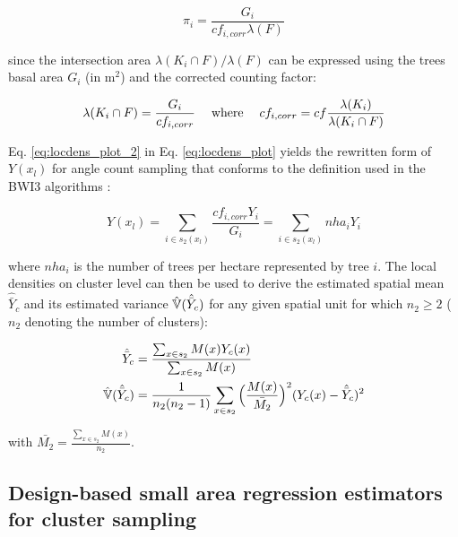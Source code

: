 \begin{equation}\label{eq:locdens_plot_2}
\pi_{i} = \frac{G_i}{cf_{i,corr}\lambda(F)}
\end{equation}

\noindent since the intersection area $\lambda(K_i \cap F)/\lambda(F)$ can be expressed using the trees basal area $G_i$ (in m$^2$) and the corrected counting factor:

\begin{equation}\label{eq:locdens_plot_3}
\lambda(K_i \cap F) = \frac{G_i}{cf_{i, corr}} \hspace{3ex} \text{where} \hspace{3ex} cf_{i,corr} = cf\frac{\lambda(K_i)}{\lambda(K_i \cap F)}
\end{equation}

Eq. \ref{eq:locdens_plot_2} in Eq. \ref{eq:locdens_plot} yields the rewritten form of $Y(x_l)$ for angle count sampling that conforms to the definition used in the BWI3 algorithms \citep{bwi3_ausw}:

\begin{equation}\label{eq:locdens_plot_4}
Y(x_l)= \sum_{i \in s_{2}(x_l)} \frac{cf_{i, corr}Y_i}{G_i} = \sum_{i \in s_{2}(x_l)} nha_{i}{Y_i}
\end{equation}

\noindent where $nha_i$ is the number of trees per hectare represented by tree $i$. The local densities on cluster level can then be used to derive the estimated spatial mean $\hat{\bar{Y}}_c$ and its estimated variance $\hat{\mathbb{V}}(\hat{\bar{Y}}_c)$ for any given spatial unit for which $n_2 \geq 2$ ($n_2$ denoting the number of clusters):

\begin{subequations}\label{eq:srs_est_clusters}
	\begin{align}
	\hat{\bar{Y}}_c &= \frac{\sum_{x \in s_2} M(x) Y_{c}(x)}{\sum_{x \in s_2} M(x)} \\
	\hat{\mathbb{V}}(\hat{\bar{Y}}_c) &= \frac{1}{n_2(n_2 - 1)}\sum_{x \in s_2}\Big(\frac{M(x)}{\bar{M_2}}\Big)^2(Y_{c}(x) - \hat{\bar{Y}}_c)^2
	\end{align}
\end{subequations}

with $\bar{M_2}=\frac{\sum_{x \in s_{2}}M(x)}{n_{2}}$.


\subsection{Design-based small area regression estimators for cluster sampling}
\label{sec:SAestimators}

